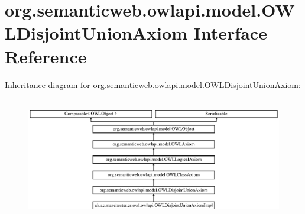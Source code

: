 \hypertarget{interfaceorg_1_1semanticweb_1_1owlapi_1_1model_1_1_o_w_l_disjoint_union_axiom}{\section{org.\-semanticweb.\-owlapi.\-model.\-O\-W\-L\-Disjoint\-Union\-Axiom Interface Reference}
\label{interfaceorg_1_1semanticweb_1_1owlapi_1_1model_1_1_o_w_l_disjoint_union_axiom}
}
Inheritance diagram for org.\-semanticweb.\-owlapi.\-model.\-O\-W\-L\-Disjoint\-Union\-Axiom\-:\begin{figure}[H]
\begin{center}
\leavevmode
\includegraphics[height=5.429363cm]{interfaceorg_1_1semanticweb_1_1owlapi_1_1model_1_1_o_w_l_disjoint_union_axiom}
\end{center}
\end{figure}
